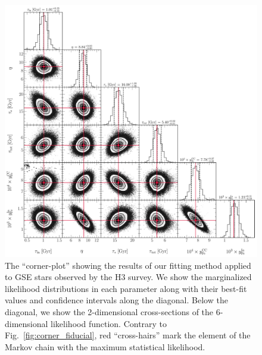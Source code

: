\documentclass[ms.tex]{subfiles}
\begin{document}
\begin{figure}
\includegraphics[scale = 0.45]{gsechem_512k.pdf}
\caption{
The ``corner-plot'' showing the results of our fitting method applied to GSE
stars observed by the H3 survey.
We show the marginalized likelihood distributions in each parameter along with
their best-fit values and confidence intervals along the diagonal.
Below the diagonal, we show the 2-dimensional cross-sections of the
6-dimensional likelihood function.
Contrary to Fig.~\ref{fig:corner_fiducial}, red ``cross-hairs'' mark the
element of the Markov chain with the maximum statistical likelihood.
}
\label{fig:gse_corner}
\end{figure}
\end{document}
